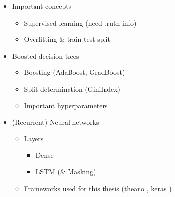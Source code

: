 \begin{itemize}
\item Important concepts
  \begin{itemize}
  \item Supervised learning (need truth info)
  \item Overfitting \& train-test split
  \end{itemize}

\item Boosted decision trees
  \begin{itemize}
  \item Boosting (AdaBoost, GradBoost)
  \item Split determination (GiniIndex)
  \item Important hyperparameters
  \end{itemize}

\item (Recurrent) Neural networks
  \begin{itemize}
  \item Layers
    \begin{itemize}
    \item Dense

    \item LSTM (\& Masking)

    \end{itemize}

  \item Frameworks used for this thesis (theano \cite{theano}, keras \cite{keras})

  \end{itemize}

\end{itemize}

